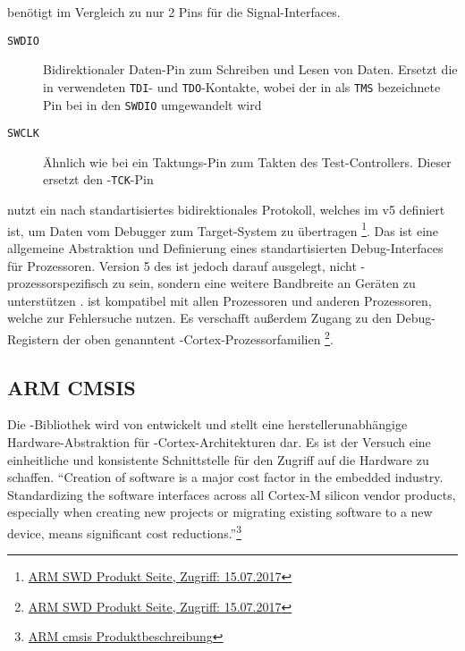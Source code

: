 	 benötigt im Vergleich zu  nur 2 Pins für die Signal-Interfaces.
	\begin{description}
	    \item[\texttt{SWDIO}] Bidirektionaler Daten-Pin zum Schreiben und Lesen von Daten. Ersetzt die in 
	    verwendeten \texttt{TDI}- und \texttt{TDO}-Kontakte, wobei der in  als \texttt{TMS} bezeichnete Pin bei
	     in den \texttt{SWDIO} umgewandelt wird \citep[vgl.~S.~6]{Booth}
	    \item[\texttt{SWCLK}] Ähnlich wie bei  ein Taktungs-Pin zum Takten des Test-Controllers. Dieser ersetzt
	    den -\texttt{TCK}-Pin \citep[vgl.~S.~6]{Booth}
	\end{description}

     nutzt ein nach  standartisiertes bidirektionales Protokoll, welches im  v5
    definiert ist, um Daten vom Debugger zum Target-System zu übertragen
    \footnote{\href{https://www.arm.com/products/processors/serial-wire-debug.php}
    {ARM SWD Produkt Seite, Zugriff: 15.07.2017}}.
    Das  ist eine allgemeine Abstraktion und Definierung eines standartisierten
    Debug-Interfaces für  Prozessoren. Version 5 des  ist jedoch darauf ausgelegt, nicht
    -prozessorspezifisch zu sein, sondern eine weitere Bandbreite an Geräten zu unterstützen
    \citep[vgl.~Kap.~1]{ArmAdi}.
     ist kompatibel mit allen  Prozessoren und anderen Prozessoren, welche  zur Fehlersuche nutzen. Es verschafft
    außerdem Zugang zu den Debug-Registern der oben genanntent -Cortex-Prozessorfamilien
    \footnote{\href{https://www.arm.com/products/processors/serial-wire-debug.php}
    {ARM SWD Produkt Seite, Zugriff: 15.07.2017}}.

    \subsection{ARM CMSIS}
    \label{sec:cmsis}
    Die -Bibliothek wird von  entwickelt und stellt eine
    herstellerunabhängige Hardware-Abstraktion für -Cortex-Architekturen dar. Es ist der Versuch eine einheitliche
    und konsistente Schnittstelle für den Zugriff auf die Hardware zu schaffen. ``Creation of software is a major cost
    factor in the embedded industry. Standardizing the software interfaces across all Cortex-M silicon vendor products,
    especially when creating new projects or migrating existing software to a new device, means significant cost
    reductions.''\footnote{\href{https://developer.arm.com/embedded/cmsis}{ARM cmsis Produktbeschreibung}}

